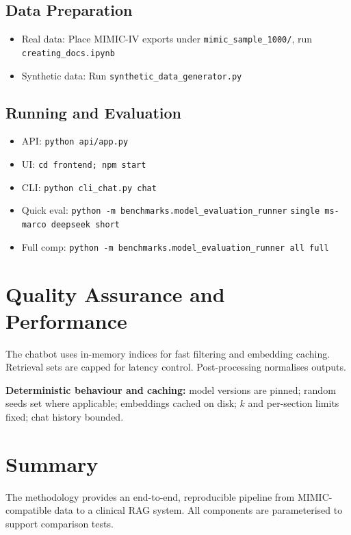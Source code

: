 \subsection{Data Preparation}
\begin{itemize}
  \item Real data: Place MIMIC-IV exports under \texttt{mimic\_sample\_1000/}, \break run \texttt{creating\_docs.ipynb}
  \item Synthetic data: Run \texttt{synthetic\_data\_generator.py}
\end{itemize}

\subsection{Running and Evaluation}
\begin{itemize}
  \item API: \texttt{python api/app.py}
  \item UI: \texttt{cd frontend; npm start}
  \item CLI: \texttt{python cli\_chat.py chat}
  \item Quick eval: \texttt{python -m benchmarks.model\_evaluation\_runner} \break \texttt{single ms-marco deepseek short}
  \item Full comp: \texttt{python -m benchmarks.model\_evaluation\_runner all full}
\end{itemize}

\section{Quality Assurance and Performance}
The chatbot uses in-memory indices for fast filtering and embedding caching. Retrieval sets are capped for latency control. Post-processing normalises outputs.

\noindent \textbf{Deterministic behaviour and caching:} model versions are pinned; random seeds set where applicable; embeddings cached on disk; \(k\) and per-section limits fixed; chat history bounded.


\section{Summary}
The methodology provides an end-to-end, reproducible pipeline from MIMIC-compatible data to a clinical RAG system. All components are parameterised to support comparison tests.
